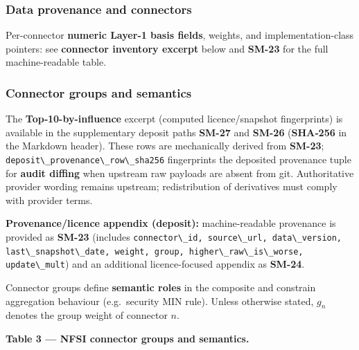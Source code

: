 \documentclass[
  11pt,
  peerreview,journal,onecolumn]{IEEEtran}
\newcommand{\passthrough}[1]{#1}
\begin{document}
\hypertarget{data-provenance-and-connectors}{%
\subsubsection{Data provenance and
connectors}\label{data-provenance-and-connectors}}

Per-connector \textbf{numeric Layer‑1 basis fields}, weights, and
implementation-class pointers: see \textbf{connector inventory excerpt}
below and \textbf{SM-23} for the full machine-readable table.

\hypertarget{connector-groups-and-semantics}{%
\subsubsection{Connector groups and
semantics}\label{connector-groups-and-semantics}}

The \textbf{Top‑10-by-influence} excerpt (computed licence/snapshot
fingerprints) is available in the supplementary deposit paths
\textbf{SM-27} and \textbf{SM-26} (\textbf{SHA‑256} in the Markdown
header). These rows are mechanically derived from \textbf{SM-23};
\passthrough{\lstinline!deposit\_provenance\_row\_sha256!} fingerprints
the deposited provenance tuple for \textbf{audit diffing} when upstream
raw payloads are absent from git. Authoritative provider wording remains
upstream; redistribution of derivatives must comply with provider terms.

\textbf{Provenance/licence appendix (deposit):} machine-readable
provenance is provided as \textbf{SM-23} (includes
\passthrough{\lstinline!connector\_id, source\_url, data\_version, last\_snapshot\_date, weight, group, higher\_raw\_is\_worse, update\_mult!})
and an additional licence-focused appendix as \textbf{SM-24}.

Connector groups define \textbf{semantic roles} in the composite and
constrain aggregation behaviour (e.g.~security MIN rule). Unless
otherwise stated, \(g_n\) denotes the group weight of connector \(n\).

\textbf{Table 3 --- NFSI connector groups and semantics.}
\end{document}
